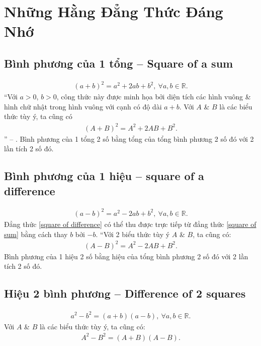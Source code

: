 \documentclass[oneside]{book}
\numberwithin{equation}{section}
\begin{document}
\section{Những Hằng Đẳng Thức Đáng Nhớ}

\subsection{Bình phương của 1 tổng -- Square of a sum}
\begin{align}
	\label{square of sum}
	\tag{sos}
	(a + b)^2 = a^2 + 2ab + b^2,\ \forall a,b\in\mathbb{R}.
\end{align}
``Với $a > 0$, $b > 0$, công thức này được minh họa bởi diện tích các hình vuông \& hình chữ nhật trong hình vuông với cạnh có độ dài $a + b$. Với $A$ \& $B$ là các biểu thức tùy ý, ta cũng có
\begin{align*}
	(A + B)^2 = A^2 + 2AB + B^2.
\end{align*}
'' -- \cite[p. 9]{SGK_Toan_8_tap_1}. Bình phương của 1 tổng 2 số bằng tổng của tổng bình phương 2 số đó với 2 lần tích 2 số đó.

\subsection{Bình phương của 1 hiệu -- square of a difference}
\begin{align}
	\label{square of difference}
	\tag{sod}
	(a - b)^2 = a^2 - 2ab + b^2,\ \forall a,b\in\mathbb{R}.
\end{align}
Đẳng thức \eqref{square of difference} có thể thu được trực tiếp từ đẳng thức \eqref{square of sum} bằng cách thay $b$ bởi $-b$. ``Với 2 biểu thức tùy ý $A$ \& $B$, ta cũng có:
\begin{align*}
	(A - B)^2 = A^2 - 2AB + B^2.
\end{align*}
Bình phương của 1 hiệu 2 số bằng hiệu của tổng bình phương 2 số đó với 2 lần tích 2 số đó. 

\subsection{Hiệu 2 bình phương -- Difference of 2 squares}
\begin{align}
	a^2 - b^2 = (a + b)(a - b),\ \forall a,b\in\mathbb{R}.
\end{align}
Với $A$ \& $B$ là các biểu thức tùy ý, ta cũng có:
\begin{align}
	A^2 - B^2 = (A + B)(A - B).
\end{align}
\end{document}
